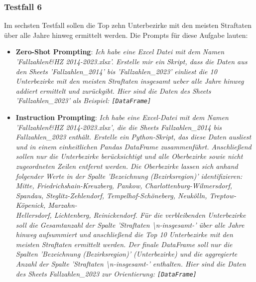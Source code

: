 \documentclass[11pt,a4paper]{article}
\begin{document}
\subsubsection{Testfall 6}
    Im sechsten Testfall sollen die Top zehn Unterbezirke mit den meisten Straftaten über alle Jahre hinweg ermittelt werden. Die Prompts für diese Aufgabe lauten:
    \begin{itemize}
        \item \textbf{Zero-Shot Prompting}: \emph{Ich habe eine Excel Datei mit dem Namen 'Fallzahlen\&HZ 2014-2023.xlsx'. Erstelle mir ein Skript, dass die Daten aus den Sheets 'Fallzahlen\_2014' bis 'Fallzahlen\_2023' einliest die 10 Unterbezirke mit den meisten Straftaten insgesamt ueber alle Jahre hinweg addiert ermittelt und zurückgibt.
        Hier sind die Daten des Sheets 'Fallzahlen\_2023' als Beispiel: \texttt{[DataFrame]}}
        \item \textbf{Instruction Prompting}: \emph{Ich habe eine Excel-Datei mit dem Namen 'Fallzahlen\&HZ 2014-2023.xlsx', die die Sheets Fallzahlen\_2014 bis Fallzahlen\_2023 enthält. Erstelle ein Python-Skript, das diese Daten ausliest und in einem einheitlichen Pandas DataFrame zusammenführt.
        Anschließend sollen nur die Unterbezirke berücksichtigt und alle Oberbezirke sowie nicht zugeordneten Zeilen entfernt werden. Die Oberbezirke lassen sich anhand folgender Werte in der Spalte 'Bezeichnung (Bezirksregion)' identifizieren: Mitte, Friedrichshain-Kreuzberg, Pankow, Charlottenburg-Wilmersdorf, Spandau, Steglitz-Zehlendorf, Tempelhof-Schöneberg, Neukölln, Treptow-Köpenick, Marzahn-\\Hellersdorf, Lichtenberg, Reinickendorf.
        Für die verbleibenden Unterbezirke soll die Gesamtanzahl der Spalte 'Straftaten \textbackslash n-insgesamt-' über alle Jahre hinweg aufsummiert und anschließend die Top 10 Unterbezirke mit den meisten Straftaten ermittelt werden. Der finale DataFrame soll nur die Spalten 'Bezeichnung (Bezirksregion)' (Unterbezirke) und die aggregierte Anzahl der Spalte 'Straftaten \textbackslash n-insgesamt-' enthalten.
        Hier sind die Daten des Sheets Fallzahlen\_2023 zur Orientierung: \texttt{[DataFrame]}}

\end{itemize}
\end{document}
